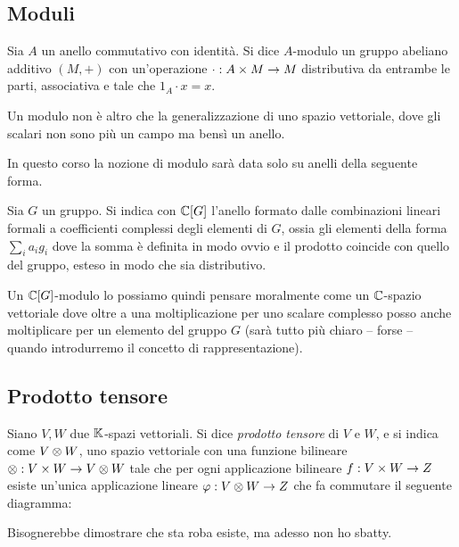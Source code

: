 \subsection{Moduli}
  \begin{mydef}
    Sia $A$ un anello commutativo con identità. Si dice $A$-modulo un gruppo abeliano additivo $(M,+)$ con un'operazione $\cdot: A\times M \rightarrow M$ distributiva da entrambe le parti, associativa e tale che $1_A \cdot x = x$.
  \end{mydef}
  
  Un modulo non è altro che la generalizzazione di uno spazio vettoriale, dove gli scalari non sono più un campo ma bensì un anello.
  
  In questo corso la nozione di modulo sarà data solo su anelli della seguente forma.
  \begin{mydef}
    Sia $G$ un gruppo. Si indica con $\mathbb C[G]$ l'anello formato dalle combinazioni lineari formali a coefficienti complessi degli elementi di $G$, ossia gli elementi della forma $\sum_i a_ig_i$ dove la somma è definita in modo ovvio e il prodotto coincide con quello del gruppo, esteso in modo che sia distributivo. 
  \end{mydef}
  
  Un $\mathbb C[G]$-modulo lo possiamo quindi pensare moralmente come un $\mathbb C$-spazio vettoriale dove oltre a una moltiplicazione per uno scalare complesso posso anche moltiplicare per un elemento del gruppo $G$ (sarà tutto più chiaro -- forse -- quando introdurremo il concetto di rappresentazione).

\subsection{Prodotto tensore}
  \begin{mydef}
    Siano $V, W$ due $\mathbb K$-spazi vettoriali. Si dice \emph{prodotto tensore} di $V$ e $W$, e si indica come $V\otimes W$, uno spazio vettoriale con una funzione bilineare $\otimes: V \times W \rightarrow V\otimes W$ tale che per ogni applicazione bilineare $f: V\times W \rightarrow Z$ esiste un'unica applicazione lineare $\varphi: V\otimes W \rightarrow Z$ che fa commutare il seguente diagramma:
    
  
  \end{mydef}
  
  Bisognerebbe dimostrare che sta roba esiste, ma adesso non ho sbatty.

